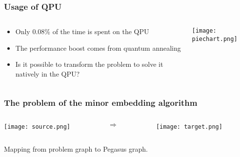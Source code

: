 \documentclass[aspectratio=169]{beamer}
\begin{document}
\begin{frame}\frametitle{Usage of QPU}

    \begin{columns}
        \begin{column}{0.4\textwidth}
            \begin{itemize}
                \item Only 0.08\% of the time is spent on the QPU
                \item The performance boost comes from quantum annealing
                \item Is it possible to transform the problem to solve it natively in the QPU?
            \end{itemize}
        \end{column}
        \begin{column}{0.6\textwidth}
            \begin{flushright}
                \texttt{[image: piechart.png]}
            \end{flushright}
        \end{column}
    \end{columns}

\end{frame}

\begin{frame}\frametitle{The problem of the minor embedding algorithm}

    \begin{columns}
        \begin{column}{0.4\textwidth}
            \begin{flushleft}
                \texttt{[image: source.png]}
            \end{flushleft}
        \end{column}
        \begin{column}{0.1\textwidth}
            \LARGE
            $\Longrightarrow$
        \end{column}
        \begin{column}{0.4\textwidth}
            \begin{flushright}
                \texttt{[image: target.png]}
            \end{flushright}
        \end{column}
    \end{columns}

    \begin{center}
        Mapping from problem graph to Pegasus graph.
    \end{center}

\end{frame}
\end{document}
